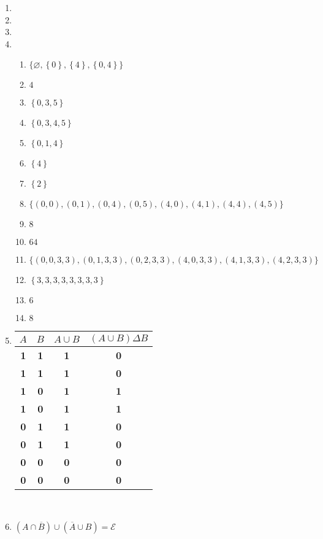 \begin{enumerate}[leftmargin=2cm,labelsep=.5cm,label=\bf\arabic*.]
\item

\item

\item

\item
\begin{enumerate}
  \item $\big\{\varnothing,\left\{0\right\},\left\{4\right\},\left\{0,4\right\} \big\}$
  \item $4$
  \item $\left\{0,3,5 \right\}$
  \item $\left\{0,3,4,5 \right\}$
  \item $\left\{0,1,4 \right\}$
  \item $\left\{4 \right\}$
  \item $\left\{2 \right\}$
  \item $\big\{\left(0,0\right),\left(0,1\right),\left(0,4\right),\left(0,5\right),\left(4,0\right),\left(4,1\right),\left(4,4\right),\left(4,5\right) \big\}$
  \item $8$
  \item $64$
  \item $\big\{\left(0,0,3,3\right),\left(0,1,3,3\right),\left(0,2,3,3\right),\left(4,0,3,3\right),\left(4,1,3,3\right),\left(4,2,3,3\right) \big\}$
  \item $\left\{3,3,3,3,3,3,3,3 \right\}$
  \item $6$
  \item $8$\\[5mm]
\end{enumerate}

\item
\begin{tabu}[t]{|c|c|c|c|}
\hline
$A$ & $B$ & $A\cup B$ & $(A\cup B)\Delta B$ \\ \hline
\textbf{1} & \textbf{1} & \textbf{1} & \textbf{0} \\ \hline
\textbf{1} & \textbf{1} & \textbf{1} & \textbf{0} \\ \hline
\textbf{1} & \textbf{0} & \textbf{1} & \textbf{1} \\ \hline
\textbf{1} & \textbf{0} & \textbf{1} & \textbf{1} \\ \hline
\textbf{0} & \textbf{1} & \textbf{1} & \textbf{0} \\ \hline
\textbf{0} & \textbf{1} & \textbf{1} & \textbf{0} \\ \hline
\textbf{0} & \textbf{0} & \textbf{0} & \textbf{0} \\ \hline
\textbf{0} & \textbf{0} & \textbf{0} & \textbf{0} \\ \hline
\end{tabu}\\[5mm]

\item $(A \cap \overline{B}) \cup (\overline{A} \cup B) = \mathscr{E}$\\
\ad
\end{enumerate}